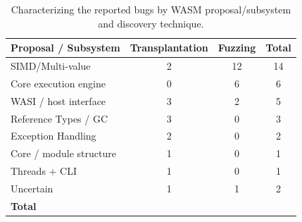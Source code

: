 \begin{table}[t]
    \centering
    \scriptsize
    \setlength{\tabcolsep}{15pt}
    \renewcommand{\arraystretch}{1.1}
    \setlength{\aboverulesep}{1pt}
    \setlength{\belowrulesep}{1pt}
    \caption{Characterizing the reported bugs by WASM proposal/subsystem and discovery technique.}
    \label{tab:proposal_technique}
    \begin{tabular}{@{}l|c|c|c@{}}
        \toprule
        \textbf{Proposal / Subsystem} & \textbf{Transplantation} & \textbf{Fuzzing} & \textbf{Total} \\
        \midrule
        SIMD/Multi-value        & 2 & 12 & 14 \\
        Core execution engine   & 0 & 6  & 6  \\
        WASI / host interface   & 3 & 2  & 5  \\
        Reference Types / GC    & 3 & 0  & 3  \\
        Exception Handling      & 2 & 0  & 2  \\
        Core / module structure & 1 & 0  & 1  \\
        Threads + CLI           & 1 & 0  & 1  \\
        Uncertain               & 1 & 1  & 2  \\
        \midrule
        \textbf{Total} &
        \textbf{\TransplantationBugsCount{}} &
        \textbf{\ReportedFuzzingBugsCount{}} &
        \textbf{\ReportedBugs{}} \\
        \bottomrule
    \end{tabular}
\end{table}
